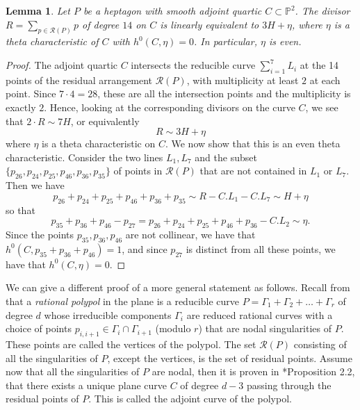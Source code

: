 \documentclass[12pt]{article}
\newtheorem{lemma}[theorem]{Lemma}
\numberwithin{equation}{section}
\theoremstyle{definition}
\renewcommand{\P}{\mathbb{P}}
\begin{document}
\begin{lemma}\label{lem:thetachar}
  Let $P$ be a heptagon with smooth adjoint quartic $C\subset \P^2$. 
  The divisor $R=\sum_{p\in \mathcal{R}(P)} p$ of degree $14$ on $C$ is linearly equivalent to $3H + \eta$, where $\eta$ is a theta characteristic of $C$ with $h^0(C,\eta)=0$. In particular, $\eta$ is even.
\end{lemma}

\begin{proof}
The adjoint quartic $C$ intersects the reducible curve $\sum_{i=1}^7 L_i$ at the 14 points of the residual arrangement $\mathcal{R}(P)$, with multiplicity at least $2$ at each point. Since $7\cdot 4 = 28$, these are all the intersection points and the multiplicity is exactly $2$. 
Hence, looking at the corresponding divisors on the curve $C$, we see that $2\cdot R \sim 7H$, or equivalently
\[ R \sim 3H + \eta \]
where $\eta$ is a theta characteristic on $C$. We now show that this is an even theta characteristic. Consider the two lines $L_1,L_7$ and the subset $\{p_{26},p_{24},p_{25},p_{46},p_{36},p_{35}\}$ of points in $\mathcal{R}(P)$ that are not contained in $L_1$ or $L_7$. Then we have
\begin{equation}\label{eq:ztheta}
 p_{26}+p_{24}+p_{25}+p_{46}+p_{36}+p_{35} \sim R - C.L_1 - C.L_7 \sim H+\eta 
\end{equation}
so that
\begin{equation}\label{eq:scorzafirst} 
p_{35}+p_{36}+p_{46}-p_{27} = p_{26}+p_{24}+p_{25}+p_{46}+p_{36} - C.L_2 \sim \eta. 
\end{equation}
Since the points $p_{35},p_{36},p_{46}$ are not collinear, we have that $h^0(C,p_{35}+p_{36}+p_{46})=1$, and since $p_{27}$ is distinct from all these points, we have that $h^0(C,\eta)=0$.
\end{proof}

We can give a different proof of a more general statement as follows. Recall from \cite{polypols} that a \emph{rational polypol} in the plane is a reducible curve $P=\Gamma_1+\Gamma_2+\dots+\Gamma_r$ of degree $d$ whose irreducible components $\Gamma_i$ are reduced rational curves  with a choice of points $p_{i,{i+1}}\in \Gamma_i\cap \Gamma_{i+1}$ (modulo $r$) that are nodal singularities of $P$. These points are called the vertices of the polypol. The set $\mathcal{R}(P)$ consisting of all the singularities of $P$, except the vertices, is the set of residual points. Assume now that all the singularities of $P$ are nodal, then it is proven in \cite{polypols}*{Proposition 2.2}, that there exists a unique plane curve $C$ of degree $d-3$ passing through the residual points of $P$. This is called the adjoint curve of the polypol. 
\end{document}
